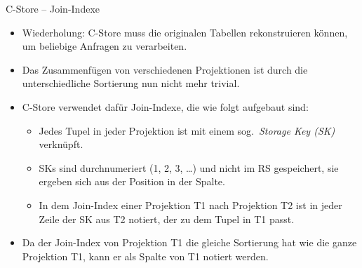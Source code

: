 \begin{frame}{C-Store -- Join-Indexe}
\begin{itemize}[<.->]
	\item<+-> Wiederholung: C-Store muss die originalen Tabellen rekonstruieren k\"onnen, um beliebige Anfragen zu verarbeiten.
	\item Das Zusammenf\"ugen von verschiedenen Projektionen ist durch die unterschiedliche Sortierung nun nicht mehr trivial.
	\item<+-> C-Store verwendet daf\"ur Join-Indexe, die wie folgt aufgebaut sind:
  \begin{itemize}
		\item Jedes Tupel in jeder Projektion ist mit einem sog.\ \textit{Storage Key (SK)} verkn\"upft.
		\item SKs sind durchnumeriert (1, 2, 3, \ldots ) und nicht im RS gespeichert, sie ergeben sich aus der Position in der Spalte.
		\item In dem Join-Index einer Projektion T1 nach Projektion T2 ist in jeder Zeile der SK aus T2 notiert, der zu dem Tupel in T1 passt.
	\end{itemize}
	\item<+-> Da der Join-Index von Projektion T1 die gleiche Sortierung hat wie die ganze Projektion T1, kann er als Spalte von T1 notiert werden.
\end{itemize}

\end{frame}

